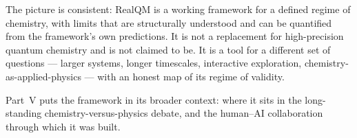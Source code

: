 The picture is consistent: RealQM is a working framework for a defined regime of chemistry, with limits that are structurally understood and can be quantified from the framework's own predictions. It is not a replacement for high-precision quantum chemistry and is not claimed to be. It is a tool for a different set of questions --- larger systems, longer timescales, interactive exploration, chemistry-as-applied-physics --- with an honest map of its regime of validity.

Part~V puts the framework in its broader context: where it sits in the long-standing chemistry-versus-physics debate, and the human--AI collaboration through which it was built.

